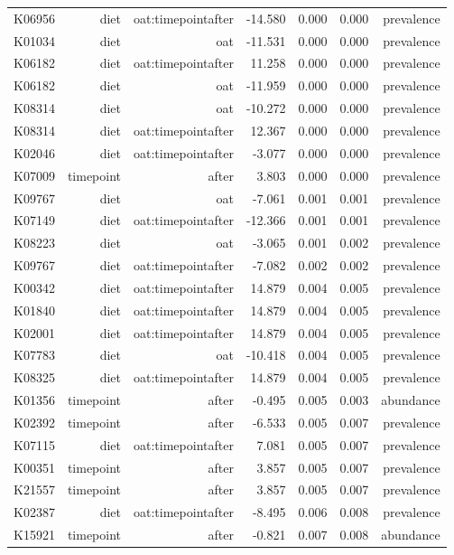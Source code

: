 \documentclass[
]{article}
\begin{document}
\begin{longtable}[t]{lrrrrrr}
K06956 & diet & oat:timepointafter & -14.580 & 0.000 & 0.000 & prevalence\\
K01034 & diet & oat & -11.531 & 0.000 & 0.000 & prevalence\\
K06182 & diet & oat:timepointafter & 11.258 & 0.000 & 0.000 & prevalence\\
K06182 & diet & oat & -11.959 & 0.000 & 0.000 & prevalence\\
\addlinespace
K08314 & diet & oat & -10.272 & 0.000 & 0.000 & prevalence\\
K08314 & diet & oat:timepointafter & 12.367 & 0.000 & 0.000 & prevalence\\
K02046 & diet & oat:timepointafter & -3.077 & 0.000 & 0.000 & prevalence\\
K07009 & timepoint & after & 3.803 & 0.000 & 0.000 & prevalence\\
K09767 & diet & oat & -7.061 & 0.001 & 0.001 & prevalence\\
\addlinespace
K07149 & diet & oat:timepointafter & -12.366 & 0.001 & 0.001 & prevalence\\
K08223 & diet & oat & -3.065 & 0.001 & 0.002 & prevalence\\
K09767 & diet & oat:timepointafter & -7.082 & 0.002 & 0.002 & prevalence\\
K00342 & diet & oat:timepointafter & 14.879 & 0.004 & 0.005 & prevalence\\
K01840 & diet & oat:timepointafter & 14.879 & 0.004 & 0.005 & prevalence\\
\addlinespace
K02001 & diet & oat:timepointafter & 14.879 & 0.004 & 0.005 & prevalence\\
K07783 & diet & oat & -10.418 & 0.004 & 0.005 & prevalence\\
K08325 & diet & oat:timepointafter & 14.879 & 0.004 & 0.005 & prevalence\\
K01356 & timepoint & after & -0.495 & 0.005 & 0.003 & abundance\\
K02392 & timepoint & after & -6.533 & 0.005 & 0.007 & prevalence\\
\addlinespace
K07115 & diet & oat:timepointafter & 7.081 & 0.005 & 0.007 & prevalence\\
K00351 & timepoint & after & 3.857 & 0.005 & 0.007 & prevalence\\
K21557 & timepoint & after & 3.857 & 0.005 & 0.007 & prevalence\\
K02387 & diet & oat:timepointafter & -8.495 & 0.006 & 0.008 & prevalence\\
K15921 & timepoint & after & -0.821 & 0.007 & 0.008 & abundance\\

\end{longtable}
\end{document}
